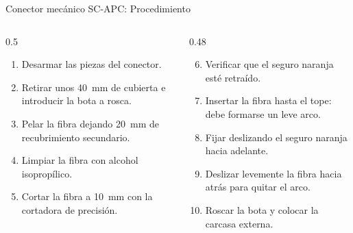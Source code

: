 \documentclass[aspectratio=169,10pt]{beamer}
\begin{document}
\begin{frame}{Conector mecánico SC-APC: Procedimiento}
  \small
  \begin{columns}[T]
    \begin{column}{0.5\textwidth}
      \begin{enumerate}
        \item Desarmar las piezas del conector.
        \item Retirar unos {40~mm} de cubierta e introducir la bota a rosca.
        \item Pelar la fibra dejando {20~mm} de recubrimiento secundario.
        \item Limpiar la fibra con alcohol isopropílico.
        \item Cortar la fibra a {10~mm} con la cortadora de precisión.
      \end{enumerate}
    \end{column}
    \begin{column}{0.48\textwidth}
      \begin{enumerate}
        \setcounter{enumi}{5}
        \item Verificar que el seguro naranja esté retraído.
        \item Insertar la fibra hasta el tope: debe formarse un {leve arco}.
        \item Fijar deslizando el seguro naranja hacia adelante.
        \item Deslizar levemente la fibra hacia atrás para quitar el arco.
        \item Roscar la bota y colocar la carcasa externa.
      \end{enumerate}
    \end{column}
  \end{columns}
\end{frame}
\end{document}
